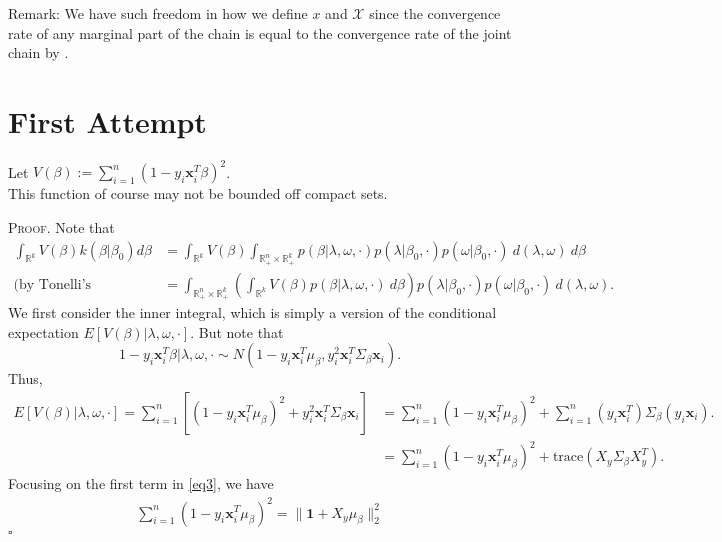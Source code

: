 \documentclass[12pt]{article}
\newcounter{ProofCounter}
\newenvironment{Proof}{\stepcounter{ProofCounter}\textsc{Proof.}}{\hfill$\square$}
\numberwithin{equation}{section}
\begin{document}
Remark: We have such freedom in how we define $x$ and $\mathcal{X}$ since the convergence rate of any marginal part of the chain is equal to the convergence rate
of the joint chain by \cite{jointvmarg}.

\newpage

\section{First Attempt}

Let $V(\beta) := \sum_{i=1}^{n}(1 - y_i\bm{x}_i^T\beta)^2$. \\

This function of course may not be bounded off compact sets.

\begin{Proof}
  Note that 
  \begin{align}
    \int_{\mathbb{R}^{k}} V(\beta) k(\beta|\beta_0)d\beta & = \int_{\mathbb{R}^{k}}V(\beta) \int_{\mathbb{R}^{n}_+\times \mathbb{R}^{k}_+}
    p(\beta|\lambda,\omega, \cdot)p(\lambda|\beta_0, \cdot)p(\omega|\beta_0, \cdot)\ d(\lambda, \omega)\ d\beta \nonumber \\
    \text{(by Tonelli's Theorem)} \ & = \int_{\mathbb{R}^{n}_+\times\mathbb{R}^{k}_+} \left( \int_{\mathbb{R}^{k}} V(\beta)p(\beta|\lambda, \omega,
    \cdot)\ d\beta \right) p(\lambda|\beta_0,\cdot)p(\omega|\beta_0, \cdot)\ d(\lambda, \omega).
    \label{eq0}
  \end{align}
  We first consider the inner integral, which is simply a version of the conditional expectation $E[V(\beta)|\lambda,\omega,\cdot]$.
  But note that 
  \begin{equation*}
    1 - y_i\bm{x}_i^T\beta | \lambda, \omega, \cdot \sim N\left( 1 - y_i\bm{x}_i^T\mu_{\beta}, y_i^2 \bm{x}_i^T \Sigma_{\beta}\bm{x}_i\right).
    \label{eq2}
  \end{equation*}
  Thus,
  \begin{align}
    E[V(\beta)|\lambda,\omega,\cdot] = \sum_{i=1}^{n}\left[(1 - y_i\bm{x}_i^T\mu_{\beta})^2 + y_i^2 \bm{x}_i^T \Sigma_{\beta} \bm{x}_i\right] & = \sum_{i=1}^{n}
    (1 - y_i\bm{x}_i^T\mu_{\beta})^2 + \sum_{i=1}^{n}(y_i\bm{x}_i^T)\Sigma_{\beta}(y_i \bm{x}_i). \nonumber \\
    & = \sum_{i=1}^{n} (1 - y_i\bm{x}_i^T\mu_{\beta})^2 + \text{trace}(X_{y} \Sigma_{\beta} X_{y}^T).
    \label{eq3}
  \end{align}
  Focusing on the first term in \eqref{eq3}, we have 
  \begin{align}
    \sum_{i=1}^{n}(1 - y_i \bm{x}_i^T \mu_{\beta})^2 = \|\mathbf{1} + X_{y}\mu_{\beta}\|_{2}^{2} 

\end{align}
\end{Proof}
\end{document}
